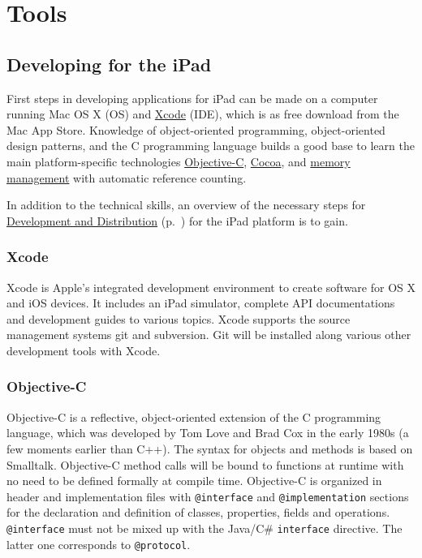 
\section{Tools}

\subsection{Developing for the iPad}

First steps in developing applications for iPad can be made on a computer running Mac OS X (OS) and 
\href{sec:Xcode}{Xcode} (IDE), which is as free download from the Mac App Store.
Knowledge of object-oriented programming, object-oriented design patterns, 
and the C programming language 
builds a good base to learn the main platform-specific technologies 
\href{sec:ObjC}{Objective-C},
\href{sec:Cocoa}{Cocoa}, and
\href{sec:MemoryManagement}{memory management}
with automatic reference counting.

In addition to the technical skills, an overview of the necessary steps for 
\href{sec:DAD}{Development and Distribution} (p.~\pageref{sec:DAD}) for the iPad platform
is to gain.

\subsubsection{Xcode}
\label{sec:Xcode}

Xcode is Apple's integrated development environment to create software for OS X and iOS devices.
It includes an iPad simulator, complete API documentations and development guides to various topics. 
Xcode supports the source management systems git and subversion. 
Git will be installed along various other development tools with Xcode.

\subsubsection{Objective-C}
\label{sec:ObjC}
Objective-C is a reflective, object-oriented extension of the C programming language,
 which was developed by Tom Love and Brad Cox in the early 1980s (a few moments earlier than C++). 
The syntax for objects and methods is based on Smalltalk. 
Objective-C method calls will be bound to functions at runtime with no need to be defined formally at compile time.
Objective-C is organized in header and implementation files 
with \verb+@interface+ and \verb+@implementation+ sections for
the declaration and definition of classes, properties, fields and operations.
\verb+@interface+ must not be mixed up with the Java/C\# \verb+interface+ directive. 
The latter one corresponds to \verb+@protocol+.



